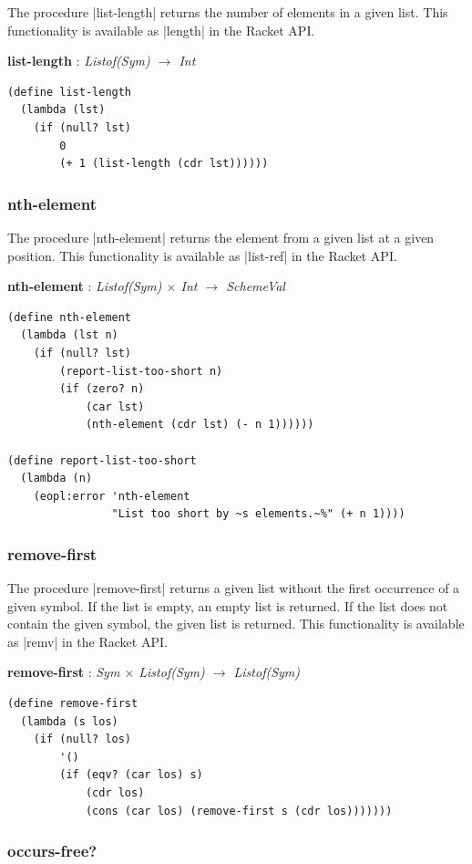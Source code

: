 \documentclass[a4paper]{article}
\begin{document}
The procedure |list-length| returns the number of elements in a given list. This functionality is available as |length| in the Racket API.

\textbf{list-length} : \textit{Listof(Sym) $\rightarrow$ Int}
\begin{lstlisting}[aboveskip=0pt]
(define list-length
  (lambda (lst)
    (if (null? lst)
        0
        (+ 1 (list-length (cdr lst))))))
\end{lstlisting}

\subsubsection{nth-element}

The procedure |nth-element| returns the element from a given list at a given position. This functionality is available as |list-ref| in the Racket API.

\textbf{nth-element} : \textit{Listof(Sym) $\times$ Int $\rightarrow$ SchemeVal}
\begin{lstlisting}[aboveskip=0pt]
(define nth-element
  (lambda (lst n)
    (if (null? lst)
        (report-list-too-short n)
        (if (zero? n)
            (car lst)
            (nth-element (cdr lst) (- n 1))))))
            
(define report-list-too-short
  (lambda (n)
    (eopl:error 'nth-element
                "List too short by ~s elements.~%" (+ n 1))))
\end{lstlisting}

\subsubsection{remove-first}

The procedure |remove-first| returns a given list without the first occurrence of a given symbol. If the list is empty, an empty list is returned. If the list does not contain the given symbol, the given list is returned. This functionality is available as |remv| in the Racket API.

\textbf{remove-first} : \textit{Sym $\times$ Listof(Sym) $\rightarrow$ Listof(Sym)}
\begin{lstlisting}[aboveskip=0pt]
(define remove-first
  (lambda (s los)
    (if (null? los)
        '()
        (if (eqv? (car los) s)
            (cdr los)
            (cons (car los) (remove-first s (cdr los)))))))
\end{lstlisting}

\subsubsection{occurs-free?}
\end{document}
